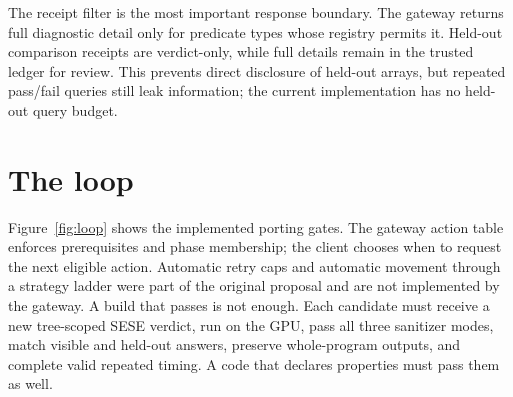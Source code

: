 \documentclass[11pt]{article}
\begin{document}
The receipt filter is the most important response boundary. The gateway returns
full diagnostic detail only for predicate types whose registry permits it.
Held-out comparison receipts are verdict-only, while full details remain in the
trusted ledger for review. This prevents direct disclosure of held-out arrays,
but repeated pass/fail queries still leak information; the current
implementation has no held-out query budget.

\section{The loop}

Figure~\ref{fig:loop} shows the implemented porting gates. The gateway action
table enforces prerequisites and phase membership; the client chooses when to
request the next eligible action. Automatic retry caps and automatic movement
through a strategy ladder were part of the original proposal and are not
implemented by the gateway. A build that passes is not enough. Each candidate
must receive a new tree-scoped SESE verdict, run on the GPU, pass all three
sanitizer modes, match visible and held-out answers, preserve whole-program
outputs, and complete valid repeated timing. A code that declares properties
must pass them as well.
\end{document}
